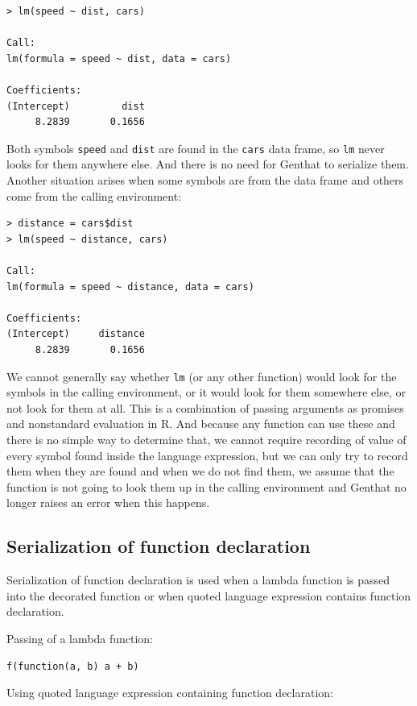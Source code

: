\documentclass[thesis=B,english]{FITthesis}[2012/10/20]
\begin{document}
\begin{verbatim}
> lm(speed ~ dist, cars)

Call:
lm(formula = speed ~ dist, data = cars)

Coefficients:
(Intercept)         dist
     8.2839       0.1656
\end{verbatim}

Both symbols \verb|speed| and \verb|dist| are found in the \verb|cars| data frame, so \verb|lm| never looks for them anywhere else. And there is no need for Genthat to serialize them. Another situation arises when some symbols are from the data frame and others come from the calling environment:

\begin{verbatim}
> distance = cars$dist
> lm(speed ~ distance, cars)

Call:
lm(formula = speed ~ distance, data = cars)

Coefficients:
(Intercept)     distance
     8.2839       0.1656
\end{verbatim}

We cannot generally say whether \verb|lm| (or any other function) would look for the symbols in the calling environment, or it would look for them somewhere else, or not look for them at all. This is a combination of passing arguments as promises and nonstandard evaluation in R. And because any function can use these and there is no simple way to determine that, we cannot require recording of value of every symbol found inside the language expression, but we can only try to record them when they are found and when we do not find them, we assume that the function is not going to look them up in the calling environment and Genthat no longer raises an error when this happens. 

\subsection{Serialization of function declaration} \label{ssub:clos2}
Serialization of function declaration is used when a lambda function is passed into the decorated function or when quoted language expression contains function declaration.

Passing of a lambda function:

\begin{verbatim}
f(function(a, b) a + b)
\end{verbatim}

Using quoted language expression containing function declaration:
\end{document}
